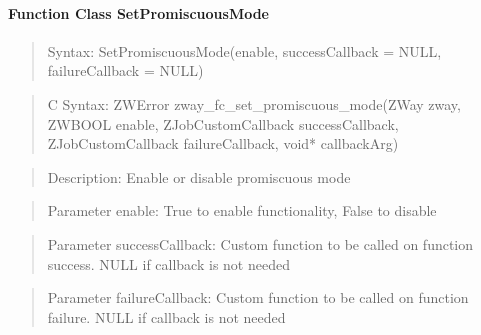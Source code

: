 \paragraph{Function Class SetPromiscuousMode}
\begin{quote}Syntax: SetPromiscuousMode(enable, successCallback = NULL, failureCallback = NULL)\end{quote}
\begin{quote}C Syntax: ZWError zway\_fc\_set\_promiscuous\_mode(ZWay zway, ZWBOOL enable, ZJobCustomCallback successCallback, ZJobCustomCallback failureCallback, void* callbackArg)\end{quote}
\begin{quote}Description: Enable or disable promiscuous mode\end{quote}
\begin{quote}Parameter enable: True to enable functionality, False to disable\end{quote}
\begin{quote}Parameter successCallback: Custom function to be called on function success. NULL if callback is not needed\end{quote}
\begin{quote}Parameter failureCallback: Custom function to be called on function failure. NULL if callback is not needed\end{quote}



